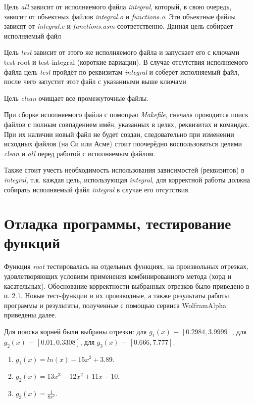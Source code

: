 \documentclass[a4paper,12pt,titlepage,finall]{article}
\begin{document}
Цель \textit{all} зависит от исполняемого файла \textit{integral}, который, в свою очередь, зависит от объектных файлов \textit{integral.o} и \textit{functions.o}. Эти объектные файлы зависят от \textit{integral.c} и \textit{functions.asm} соответственно. Данная цель собирает исполняемый файл\par
Цель \textit{test} зависит от этого же исполняемого файла и запускает его с ключами test-root и test-integral (короткие вариации). В случае отсутствия исполняемого файла цель \textit{test} пройдёт по реквизитам \textit{integral} и соберёт исполняемый файл, после чего запустит этот файл с указанными выше ключами\par
Цель \textit{clean} очищает все промежуточные файлы.\par
При сборке исполняемого файла с помощью \textit{Makefile}, сначала проводится поиск файлов с полным совпадением имён, указанных в целях, реквизитах и командах. При их наличии новый файл не будет создан, следовательно при изменении исходных файлов (на Си или Асме) стоит поочерёдно воспользоваться целями \textit{clean} и \textit{all} перед работой с исполняемым файлом.\par
Также стоит учесть необходимость использования зависимостей (реквизитов) в \textit{integral}, т.к. каждая цель, использующая \textit{integral}, для корректной работы должна собирать исполняемый файл \textit{integral} в случае его отсутствия.
\newpage

\section{Отладка программы, тестирование функций}

Функция \textit{root} тестировалась на отдельных функциях, на произвольных отрезках, удовлетворяющих условиям применения комбинированного метода (хорд и касательных). Обоснование корректности выбранных отрезков было приведено в п. 2.1. Новые тест-функции и их производные, а также результаты работы программы и результаты, полученные с помощью сервиса WolframAlpha приведены далее.

Для поиска корней были выбраны отрезки: для {$g_1(x)$} $-$ {$[0.2984, 3.9999]$}, для {$g_2(x)$} $-$ {$[0.01, 0.3308]$}, для {$g_3(x)$} $-$ {$[0.666, 7.777]$}. \\\par

\begin{enumerate}
\item {$g_1(x) = ln(x) - 15x^2 + 3.89$}.
\item {$g_2(x) = 13x^3 - 12x^2 + 11x - 10$}.
\item {$g_3(x) = \frac{1}{8x^2}$}.
\end{enumerate}\par
\end{document}
